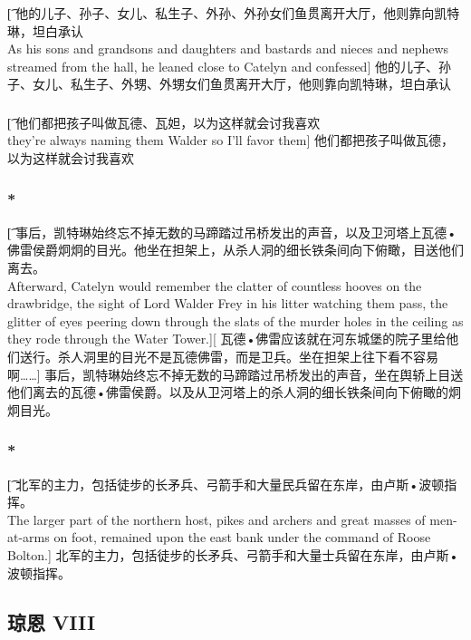 \documentclass[12pt,a4paper]{article}
\begin{document}
\subsubsection{}\t[
	他的儿子、孙子、女儿、私生子、外孙、外孙女们鱼贯离开大厅，他则靠向凯特琳，坦白承认\\
	As his sons and grandsons and daughters and bastards and nieces and nephews streamed from the hall, he leaned close to Catelyn and confessed]
	他的儿子、孙子、女儿、私生子、外甥、外甥女们鱼贯离开大厅，他则靠向凯特琳，坦白承认
	
\subsubsection{}\t[
	他们都把孩子叫做瓦德、瓦妲，以为这样就会讨我喜欢\\
	they're always naming them Walder so I'll favor them]
	他们都把孩子叫做瓦德，以为这样就会讨我喜欢
	
\subsubsection{\color{red}*}\t[
	事后，凯特琳始终忘不掉无数的马蹄踏过吊桥发出的声音，以及卫河塔上瓦德•佛雷侯爵炯炯的目光。他坐在担架上，从杀人洞的细长铁条间向下俯瞰，目送他们离去。\\
	Afterward, Catelyn would remember the clatter of countless hooves on the drawbridge, the sight of Lord Walder Frey in his litter watching them pass, the glitter of eyes peering down through the slats of the murder holes in the ceiling as they rode through the Water Tower.][
	瓦德•佛雷应该就在河东城堡的院子里给他们送行。杀人洞里的目光不是瓦德佛雷，而是卫兵。坐在担架上往下看不容易啊……]
	事后，凯特琳始终忘不掉无数的马蹄踏过吊桥发出的声音，坐在舆轿上目送他们离去的瓦德•佛雷侯爵。以及从卫河塔上的杀人洞的细长铁条间向下俯瞰的炯炯目光。
	
\subsubsection{\color{red}*}\t[
	北军的主力，包括徒步的长矛兵、弓箭手和大量民兵留在东岸，由卢斯•波顿指挥。\\
	The larger part of the northern host, pikes and archers and great masses of men-at-arms on foot, remained upon the east bank under the command of Roose Bolton.]
	北军的主力，包括徒步的长矛兵、弓箭手和大量士兵留在东岸，由卢斯•波顿指挥。
	

\subsection{琼恩 VIII}
\end{document}
